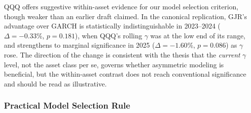 QQQ offers suggestive within-asset evidence for our model selection criterion, though weaker than an earlier draft claimed. In the canonical replication, GJR's advantage over GARCH is statistically indistinguishable in 2023--2024 ($\Delta = -0.33\%$, $p = 0.181$), when QQQ's rolling $\gamma$ was at the low end of its range, and strengthens to marginal significance in 2025 ($\Delta = -1.60\%$, $p = 0.086$) as $\gamma$ rose. The direction of the change is consistent with the thesis that the \textit{current} $\gamma$ level, not the asset class per se, governs whether asymmetric modeling is beneficial, but the within-asset contrast does not reach conventional significance and should be read as illustrative.

\subsubsection{Practical Model Selection Rule}

